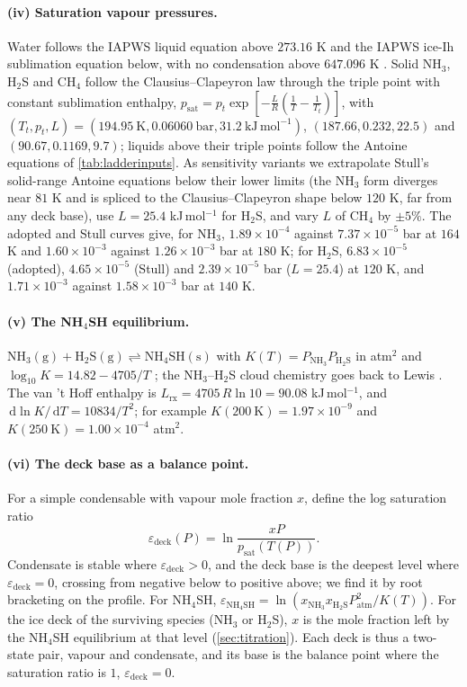 \documentclass[11pt]{article}
\theoremstyle{definition}\newtheorem{definition}[theorem]{Definition}
\theoremstyle{remark}\newtheorem{remark}[theorem]{Remark}
\newcommand{\dd}{\,\mathrm d}\newcommand{\e}{\mathrm e}
\newcommand{\NH}{\mathrm{NH_3}}\newcommand{\HS}{\mathrm{H_2S}}\newcommand{\NHSH}{\mathrm{NH_4SH}}
\begin{document}
\paragraph{(iv) Saturation vapour pressures.} Water follows the IAPWS liquid equation above $273.16$ K and the IAPWS ice-Ih sublimation equation below, with no condensation above $647.096$ K \cite{WagnerPruss,Wagner2011}. Solid NH$_3$, H$_2$S and CH$_4$ follow the Clausius--Clapeyron law through the triple point with constant sublimation enthalpy, $p_\mathrm{sat}=p_t\exp[-\frac LR(\frac1T-\frac1{T_t})]$, with $(T_t,p_t,L)=(194.95\ \mathrm K,0.06060\ \mathrm{bar},31.2\ \mathrm{kJ\,mol^{-1}})$, $(187.66,0.232,22.5)$ and $(90.67,0.1169,9.7)$; liquids above their triple points follow the Antoine equations of \cref{tab:ladderinputs}. As sensitivity variants we extrapolate Stull's solid-range Antoine equations below their lower limits (the NH$_3$ form diverges near $81$ K and is spliced to the Clausius--Clapeyron shape below $120$ K, far from any deck base), use $L=25.4$ kJ\,mol$^{-1}$ for H$_2$S, and vary $L$ of CH$_4$ by $\pm5\%$. The adopted and Stull curves give, for NH$_3$, $1.89\times10^{-4}$ against $7.37\times10^{-5}$ bar at $164$ K and $1.60\times10^{-3}$ against $1.26\times10^{-3}$ bar at $180$ K; for H$_2$S, $6.83\times10^{-5}$ (adopted), $4.65\times10^{-5}$ (Stull) and $2.39\times10^{-5}$ bar ($L=25.4$) at $120$ K, and $1.71\times10^{-3}$ against $1.58\times10^{-3}$ bar at $140$ K.

\paragraph{(v) The NH$_4$SH equilibrium.} $\NH(\mathrm g)+\HS(\mathrm g)\rightleftharpoons\NHSH(\mathrm s)$ with $K(T)=P_{\NH}P_{\HS}$ in atm$^2$ and $\log_{10}K=14.82-4705/T$ \cite{AtreyaWong}; the NH$_3$--H$_2$S cloud chemistry goes back to Lewis \cite{Lewis1969}. The van 't Hoff enthalpy is $L_\mathrm{rx}=4705\,R\ln10=90.08$ kJ\,mol$^{-1}$, and $\dd\ln K/\dd T=10834/T^2$; for example $K(200\ \mathrm K)=1.97\times10^{-9}$ and $K(250\ \mathrm K)=1.00\times10^{-4}$ atm$^2$.

\paragraph{(vi) The deck base as a balance point.} For a simple condensable with vapour mole fraction $x$, define the log saturation ratio
\[
\varepsilon_\mathrm{deck}(P)=\ln\frac{xP}{p_\mathrm{sat}(T(P))}.
\]
Condensate is stable where $\varepsilon_\mathrm{deck}>0$, and the deck base is the deepest level where $\varepsilon_\mathrm{deck}=0$, crossing from negative below to positive above; we find it by root bracketing on the profile. For NH$_4$SH, $\varepsilon_{\NHSH}=\ln(x_{\NH}x_{\HS}P_\mathrm{atm}^2/K(T))$. For the ice deck of the surviving species (NH$_3$ or H$_2$S), $x$ is the mole fraction left by the NH$_4$SH equilibrium at that level (\cref{sec:titration}). Each deck is thus a two-state pair, vapour and condensate, and its base is the balance point where the saturation ratio is $1$, $\varepsilon_\mathrm{deck}=0$.
\end{document}
